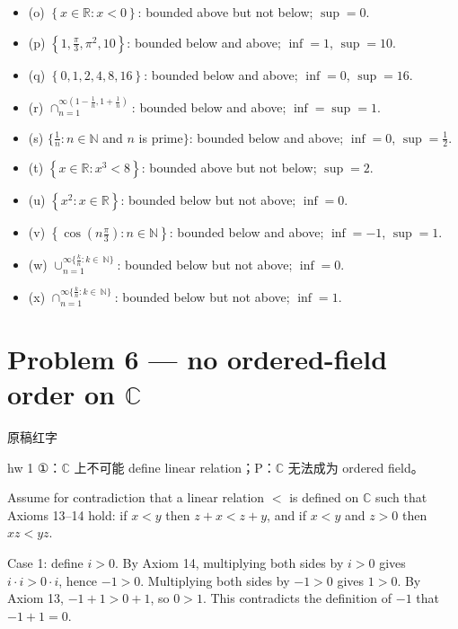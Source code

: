 \begin{itemize}
\item
  (o) \(\left\{ {x \in \mathbb{R}:x < 0} \right\}\): bounded above but not below; \(\sup = 0\).
\item
  (p) \(\left\{ {1,\frac{\pi}{3},\pi^{2},10} \right\}\): bounded below and above; \(\inf = 1\), \(\sup = 10\).
\item
  (q) \(\left\{ {0,1,2,4,8,16} \right\}\): bounded below and above; \(\inf = 0\), \(\sup = 16\).
\item
  (r) \(\cap_{n = 1}^{\infty{({1 - \frac{1}{n},1 + \frac{1}{n}})}}\): bounded below and above; \(\inf = \sup = 1\).
\item
  (s) \(\{\frac{1}{n}:n \in \mathbb{N}\) and \(n\) is prime\(\}\): bounded below and above; \(\inf = 0\), \(\sup = \frac{1}{2}\).
\item
  (t) \(\left\{ {x \in \mathbb{R}:x^{3} < 8} \right\}\): bounded above but not below; \(\sup = 2\).
\item
  (u) \(\left\{ {x^{2}:x \in \mathbb{R}} \right\}\): bounded below but not above; \(\inf = 0\).
\item
  (v) \(\left\{ {\cos\left( {n\frac{\pi}{3}} \right):n \in \mathbb{N}} \right\}\): bounded below and above; \(\inf = - 1\), \(\sup = 1\).
\item
  (w) \(\cup_{n = 1}^{\infty{\{{\frac{k}{n}:k \in \ \mathbb{N}}\}}}\): bounded below but not above; \(\inf = 0\).
\item
  (x) \(\cap_{n = 1}^{\infty{\{{\frac{k}{n}:k \in \ \mathbb{N}}\}}}\): bounded below but not above; \(\inf = 1\).
\end{itemize}

\section{\texorpdfstring{Problem 6 --- no ordered-field order on \(\mathbb{C}\)}{Problem 6 --- no ordered-field order on \textbackslash mathbb\{C\}}}

\begin{qlnote}{原稿红字}

hw 1 ①：\(\mathbb{C}\) 上不可能 define linear relation；P：\(\mathbb{C}\) 无法成为 ordered field。

\end{qlnote}

Assume for contradiction that a linear relation \(<\) is defined on \(\mathbb{C}\) such that Axioms 13--14 hold: if \(x < y\) then \(z + x < z + y\), and if \(x < y\) and \(z > 0\) then \(xz < yz\).

Case 1: define \(i > 0\). By Axiom 14, multiplying both sides by \(i > 0\) gives \(i \cdot i > 0 \cdot i\), hence \(- 1 > 0\). Multiplying both sides by \(- 1 > 0\) gives \(1 > 0\). By Axiom 13, \(- 1 + 1 > 0 + 1\), so \(0 > 1\). This contradicts the definition of \(- 1\) that \(- 1 + 1 = 0\).


